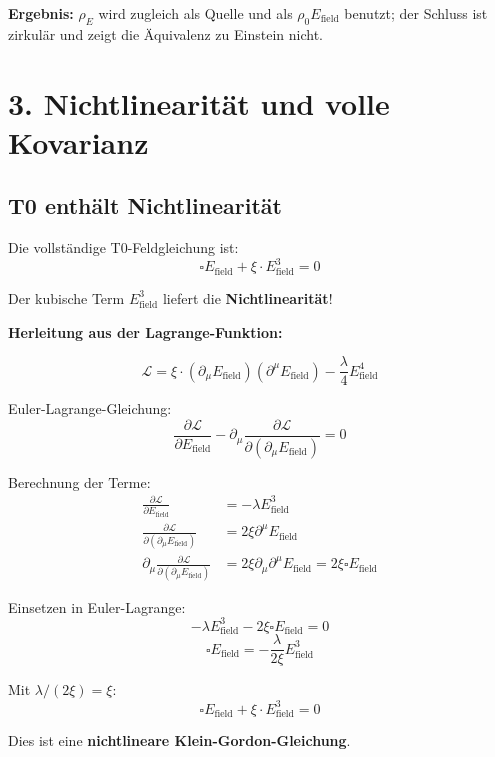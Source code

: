 	\textbf{Ergebnis:} $\rho_E$ wird zugleich als Quelle und als $\rho_0 E_{\text{field}}$ benutzt; der Schluss ist zirkulär und zeigt die Äquivalenz zu Einstein nicht.
	
	\section*{3. Nichtlinearität und volle Kovarianz}
	
	\subsection*{\textbf{T0 enthält Nichtlinearität}}
	
	Die vollständige T0-Feldgleichung ist:
	\[
	\boxed{\square E_{\text{field}} + \xi \cdot E_{\text{field}}^3 = 0}
	\]
	
	Der kubische Term $E_{\text{field}}^3$ liefert die \textbf{Nichtlinearität}!
	
	\textbf{Herleitung aus der Lagrange-Funktion:}
	
	\[
	\mathcal{L} = \xi \cdot (\partial_\mu E_{\text{field}})(\partial^\mu E_{\text{field}}) - \frac{\lambda}{4} E_{\text{field}}^4
	\]
	
	Euler-Lagrange-Gleichung:
	\[
	\frac{\partial \mathcal{L}}{\partial E_{\text{field}}} - \partial_\mu \frac{\partial \mathcal{L}}{\partial(\partial_\mu E_{\text{field}})} = 0
	\]
	
	Berechnung der Terme:
	\begin{align*}
		\frac{\partial \mathcal{L}}{\partial E_{\text{field}}} &= -\lambda E_{\text{field}}^3 \\
		\frac{\partial \mathcal{L}}{\partial(\partial_\mu E_{\text{field}})} &= 2\xi \partial^\mu E_{\text{field}} \\
		\partial_\mu \frac{\partial \mathcal{L}}{\partial(\partial_\mu E_{\text{field}})} &= 2\xi \partial_\mu \partial^\mu E_{\text{field}} = 2\xi \square E_{\text{field}}
	\end{align*}
	
	Einsetzen in Euler-Lagrange:
	\[
	-\lambda E_{\text{field}}^3 - 2\xi \square E_{\text{field}} = 0
	\]
	\[
	\square E_{\text{field}} = -\frac{\lambda}{2\xi} E_{\text{field}}^3
	\]
	
	Mit $\lambda/(2\xi) = \xi$:
	\[
	\boxed{\square E_{\text{field}} + \xi \cdot E_{\text{field}}^3 = 0}
	\]
	
	Dies ist eine \textbf{nichtlineare Klein-Gordon-Gleichung}.
	
